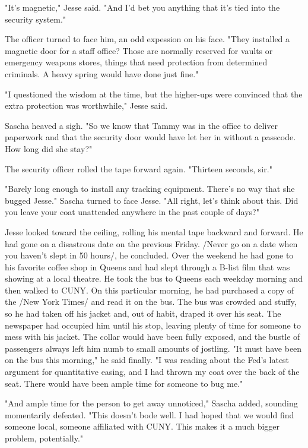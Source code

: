 "It's magnetic," Jesse said.  "And I'd bet you anything that it's tied into the security system."

The officer turned to face him, an odd expession on his face.  "They installed a magnetic door for a staff office?  Those are normally reserved for vaults or emergency weapons stores, things that need protection from determined criminals.  A heavy spring would have done just fine."

"I questioned the wisdom at the time, but the higher-ups were convinced that the extra protection was worthwhile," Jesse said.

Sascha heaved a sigh.  "So we know that Tammy was in the office to deliver paperwork and that the security door would have let her in without a passcode.  How long did she stay?"

The security officer rolled the tape forward again.  "Thirteen seconds, sir."

"Barely long enough to install any tracking equipment.  There's no way that she bugged Jesse."  Sascha turned to face Jesse.  "All right, let's think about this.  Did you leave your coat unattended anywhere in the past couple of days?"

Jesse looked toward the ceiling, rolling his mental tape backward and forward.  He had gone on a disastrous date on the previous Friday.  /Never go on a date when you haven't slept in 50 hours/, he concluded.  Over the weekend he had gone to his favorite coffee shop in Queens and had slept through a B-list film that was showing at a local theatre.  He took the bus to Queens each weekday morning and then walked to CUNY.  On this particular morning, he had purchased a copy of the /New York Times/ and read it on the bus.  The bus was crowded and stuffy, so he had taken off his jacket and, out of habit, draped it over his seat.  The newspaper had occupied him until his stop, leaving plenty of time for someone to mess with his jacket.  The collar would have been fully exposed, and the bustle of passengers always left him numb to small amounts of jostling.  "It must have been on the bus this morning," he said finally.  "I was reading about the Fed's latest argument for quantitative easing, and I had thrown my coat over the back of the seat.  There would have been ample time for someone to bug me."

"And ample time for the person to get away unnoticed," Sascha added, sounding momentarily defeated.  "This doesn't bode well.  I had hoped that we would find someone local, someone affiliated with CUNY.  This makes it a much bigger problem, potentially."

